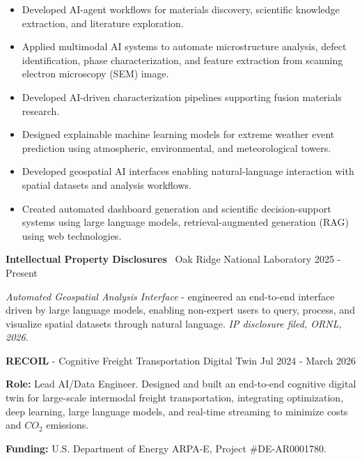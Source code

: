 \documentclass[10pt, letterpaper]{article}
\newenvironment{highlights}{
    \begin{itemize}[
        topsep=0.10 cm,
        parsep=0.10 cm,
        partopsep=0pt,
        itemsep=0pt,
        leftmargin=0 cm + 10pt
    ]
}{
    \end{itemize}
} %
\begin{document}
\begin{highlights}
    \item Developed AI-agent workflows for materials discovery, scientific knowledge extraction, and literature exploration.
    \item Applied multimodal AI systems to automate microstructure analysis, defect identification, phase characterization, and feature extraction from scanning electron microscopy (SEM) image.
    \item Developed AI-driven characterization pipelines supporting fusion materials research.
    \item Designed explainable machine learning models for extreme weather event prediction using atmospheric, environmental, and meteorological towers.
    \item Developed geospatial AI interfaces enabling natural-language interaction with spatial datasets and  analysis workflows.
    \item Created automated dashboard generation and scientific decision-support systems using large language models, retrieval-augmented generation (RAG) using web technologies.
\end{highlights}


\vspace{0.3cm}
\noindent\textbf{Intellectual Property Disclosures} \textbar\ Oak Ridge National Laboratory \hfill 2025 - Present

\noindent\textit{Automated Geospatial Analysis Interface} - engineered an end-to-end interface driven by large language models, enabling non-expert users to query, process, and visualize spatial datasets through natural language. \textit{IP disclosure filed, ORNL, 2026.}


\vspace{0.3cm}
\noindent\textbf{RECOIL} - Cognitive Freight Transportation Digital Twin \hfill Jul 2024 - March 2026

\noindent\textbf{Role:} Lead AI/Data Engineer. Designed and built an end-to-end cognitive digital twin for large-scale intermodal freight transportation, integrating optimization, deep learning, large language models, and real-time streaming to minimize costs and $CO_2$ emissions.

\noindent\textbf{Funding:} U.S. Department of Energy ARPA-E, Project \#DE-AR0001780.
\end{document}
